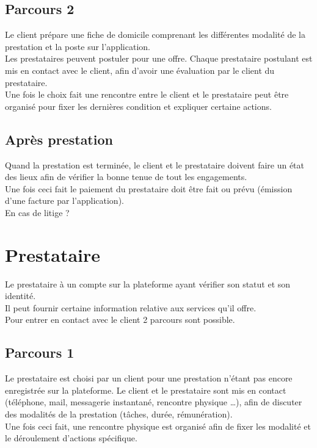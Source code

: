 \documentclass[a4paper,12pt]{article}
\begin{document}
\subsection{Parcours 2}
Le client prépare une fiche de domicile comprenant les différentes modalité de la prestation et la poste sur l'application.\\
Les prestataires peuvent postuler pour une offre. Chaque prestataire postulant est mis en contact avec le client, afin d'avoir une évaluation par le client du prestataire.\\
Une fois le choix fait une rencontre entre le client et le prestataire peut être organisé pour fixer les dernières condition et expliquer certaine actions.

\subsection{Après prestation}
Quand la prestation est terminée, le client et le prestataire doivent faire un état des lieux afin de vérifier la bonne tenue de tout les engagements.\\
Une fois ceci fait le paiement du prestataire doit être fait ou prévu (émission d'une facture par l'application).\\
En cas de litige ?

\section{Prestataire}
Le prestataire à un compte sur la plateforme ayant vérifier son statut et son identité.\\
Il peut fournir certaine information relative aux services qu'il offre.\\
Pour entrer en contact avec le client 2 parcours sont possible.

\subsection{Parcours 1}
Le prestataire est choisi par un client pour une prestation n'étant pas encore enregistrée sur la plateforme. Le client et le prestataire sont mis en contact (téléphone, mail, messagerie instantané, rencontre physique …), afin de discuter des modalités de la prestation (tâches, durée, rémunération).\\
Une fois ceci fait, une rencontre physique est organisé afin de fixer les modalité et le déroulement d'actions spécifique.\\
\end{document}
